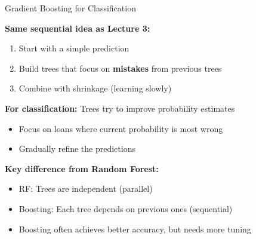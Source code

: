 \documentclass[10pt]{beamer}
\newcommand{\highlight}[1]{\textcolor{AccentOrange}{\textbf{#1}}}
\begin{document}
\begin{frame}{Gradient Boosting for Classification}

  \textbf{Same sequential idea as Lecture 3:}
  \begin{enumerate}
    \item Start with a simple prediction
    \item Build trees that focus on \highlight{mistakes} from previous trees
    \item Combine with shrinkage (learning slowly)
  \end{enumerate}

  \vspace{1em}
  \textbf{For classification:} Trees try to improve probability estimates
  \begin{itemize}
    \item Focus on loans where current probability is most wrong
    \item Gradually refine the predictions
  \end{itemize}

  \vspace{1em}
  \textbf{Key difference from Random Forest:}
  \begin{itemize}
    \item RF: Trees are independent (parallel)
    \item Boosting: Each tree depends on previous ones (sequential)
    \item Boosting often achieves better accuracy, but needs more tuning
  \end{itemize}
\end{frame}

\end{document}
